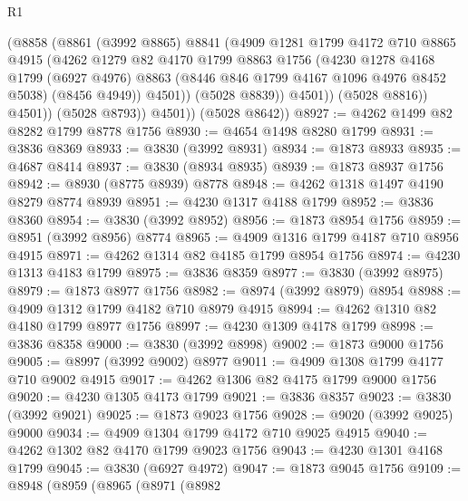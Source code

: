 \begin{lexlean}{R1}
\begin{coremodule}
                    (@8858
                      (@8861
                        (@3992 @8865)
                        @8841
                        (@4909
                          @1281
                          @1799
                          @4172
                          @710
                          @8865
                          @4915
                          (@4262
                            @1279
                            @82
                            @4170
                            @1799
                            @8863
                            @1756
                            (@4230
                              @1278
                              @4168
                              @1799
                              (@6927 @4976)
                              @8863
                              (@8446 @846 @1799 @4167 @1096 @4976 @8452 @5038)
                              (@8456 @4949))
                            @4501))
                        (@5028 @8839))
                      @4501))
                  (@5028 @8816))
                @4501))
            (@5028 @8793))
          @4501))
      (@5028 @8642))
@8927 := @4262 @1499 @82 @8282 @1799 @8778 @1756
@8930 := @4654 @1498 @8280 @1799
@8931 := @3836 @8369
@8933 := @3830 (@3992 @8931)
@8934 := @1873 @8933
@8935 := @4687 @8414
@8937 := @3830 (@8934 @8935)
@8939 := @1873 @8937 @1756
@8942 := @8930 (@8775 @8939) @8778
@8948 := @4262 @1318 @1497 @4190 @8279 @8774 @8939
@8951 := @4230 @1317 @4188 @1799
@8952 := @3836 @8360
@8954 := @3830 (@3992 @8952)
@8956 := @1873 @8954 @1756
@8959 := @8951 (@3992 @8956) @8774
@8965 := @4909 @1316 @1799 @4187 @710 @8956 @4915
@8971 := @4262 @1314 @82 @4185 @1799 @8954 @1756
@8974 := @4230 @1313 @4183 @1799
@8975 := @3836 @8359
@8977 := @3830 (@3992 @8975)
@8979 := @1873 @8977 @1756
@8982 := @8974 (@3992 @8979) @8954
@8988 := @4909 @1312 @1799 @4182 @710 @8979 @4915
@8994 := @4262 @1310 @82 @4180 @1799 @8977 @1756
@8997 := @4230 @1309 @4178 @1799
@8998 := @3836 @8358
@9000 := @3830 (@3992 @8998)
@9002 := @1873 @9000 @1756
@9005 := @8997 (@3992 @9002) @8977
@9011 := @4909 @1308 @1799 @4177 @710 @9002 @4915
@9017 := @4262 @1306 @82 @4175 @1799 @9000 @1756
@9020 := @4230 @1305 @4173 @1799
@9021 := @3836 @8357
@9023 := @3830 (@3992 @9021)
@9025 := @1873 @9023 @1756
@9028 := @9020 (@3992 @9025) @9000
@9034 := @4909 @1304 @1799 @4172 @710 @9025 @4915
@9040 := @4262 @1302 @82 @4170 @1799 @9023 @1756
@9043 := @4230 @1301 @4168 @1799
@9045 := @3830 (@6927 @4972)
@9047 := @1873 @9045 @1756
@9109 := @8948
    (@8959
      (@8965
        (@8971
          (@8982

\end{coremodule}
\end{lexlean}
